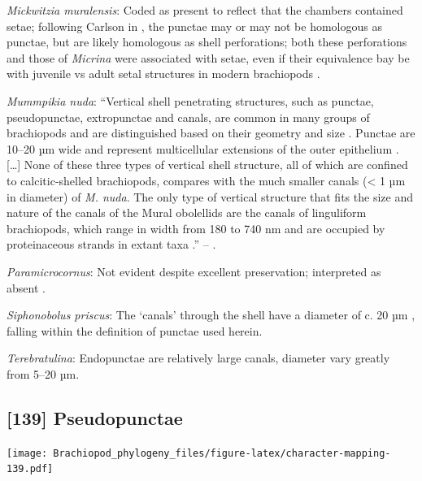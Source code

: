 \documentclass[openany]{book}
\begin{document}
\hypertarget{Mickwitzia_muralensis-coding-138}{}
\emph{Mickwitzia muralensis}: Coded as present to reflect that the
chambers contained setae; following Carlson in
\citet{Williams2007Supplement}, the punctae may or may not be homologous
as punctae, but are likely homologous as shell perforations; both these
perforations and those of \emph{Micrina} were associated with setae,
even if their equivalence bay be with juvenile vs adult setal structures
in modern brachiopods \citep[p.~397]{Balthasar2004Shellstructure}.

\hypertarget{Mummpikia_nuda-coding-138}{}
\emph{Mummpikia nuda}: ``Vertical shell penetrating structures, such as
punctae, pseudopunctae, extropunctae and canals, are common in many
groups of brachiopods and are distinguished based on their geometry and
size \citep{Williams1997Introduction}. Punctae are 10--20 µm wide and
represent multicellular extensions of the outer epithelium
\citep{Owen1969Thecaecum}. {[}\ldots{}{]} None of these three types of
vertical shell structure, all of which are confined to calcitic-shelled
brachiopods, compares with the much smaller canals (\textless{} 1 µm in
diameter) of \emph{M. nuda}. The only type of vertical structure that
fits the size and nature of the canals of the Mural obolellids are the
canals of linguliform brachiopods, which range in width from 180 to 740
nm and are occupied by proteinaceous strands in extant taxa
\citetext{\citealp[1994]{Williams1992Structureof}; \citealp{Williams1997Introduction}}.''
-- \citet{Balthasar2008iMummpikia}.

\hypertarget{Paramicrocornus-coding-138}{}
\emph{Paramicrocornus}: Not evident despite excellent preservation;
interpreted as absent \citep{Zhang2018Ahyolithid}.

\hypertarget{Siphonobolus_priscus-coding-138}{}
\emph{Siphonobolus priscus}: The `canals' through the shell have a
diameter of c. 20 µm \citep[text-fig. 2a]{Williams2004Chemicostructure},
falling within the definition of punctae used herein.

\hypertarget{Terebratulina-coding-138}{}
\emph{Terebratulina}: Endopunctae are relatively large canals, diameter
vary greatly from 5--20 µm.

\subsection*{{[}139{]} Pseudopunctae}\label{pseudopunctae}

\texttt{[image: Brachiopod\_phylogeny\_files/figure-latex/character-mapping-139.pdf]}
\end{document}
